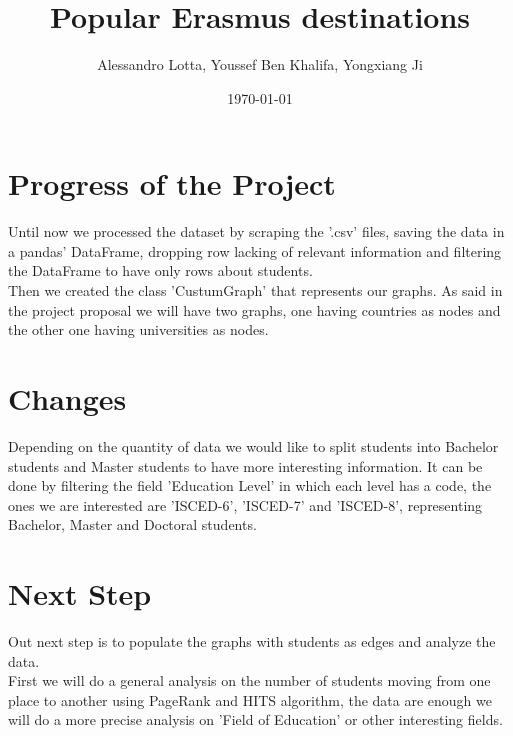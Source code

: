 
\usepackage{hyperref}
\usepackage{xurl}
\title{Popular Erasmus destinations}
\author{Alessandro Lotta, Youssef Ben Khalifa, Yongxiang Ji}
\date{\today}

\maketitle \tableofcontents 
\newpage
\section{Progress of the Project}
    Until now we processed the dataset by scraping the '.csv' files, saving the data in a pandas' DataFrame, dropping row lacking of relevant information and filtering the DataFrame to have only rows about students.
    \\Then we created the class 'CustumGraph' that represents our graphs. As said in the project proposal we will have two graphs, one having countries as nodes and the other one having universities as nodes.
    
\section{Changes}
    Depending on the quantity of data we would like to split students into Bachelor students and Master students to have more interesting information. It can be done by filtering the field 'Education Level' in which each level has a code, the ones we are interested are 'ISCED-6', 'ISCED-7' and 'ISCED-8', representing Bachelor, Master and Doctoral students.
    
\section{Next Step}
    Out next step is to populate the graphs with students as edges and analyze the data.
    \\First we will do a general analysis on the number of students moving from one place to another using PageRank and HITS algorithm, the data are enough we will do a more precise analysis on 'Field of Education' or other interesting fields.
